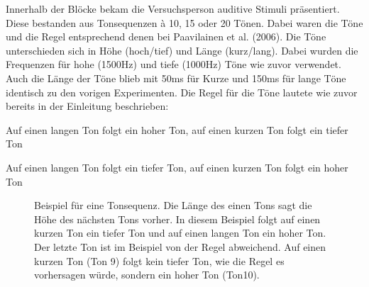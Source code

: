 \documentclass[doc,a4paper,12pt]{apa6}
\begin{document}
Innerhalb der Blöcke bekam die Versuchsperson auditive Stimuli präsentiert. Diese bestanden aus Tonsequenzen à 10, 15 oder 20 Tönen. Dabei waren die Töne und die Regel entsprechend denen bei Paavilainen et al. (2006). Die Töne unterschieden sich in Höhe (hoch/tief) und Länge (kurz/lang). Dabei wurden die Frequenzen für hohe (1500Hz) und tiefe (1000Hz) Töne wie zuvor verwendet. Auch die Länge der Töne blieb mit 50ms für Kurze und 150ms für lange Töne identisch zu den vorigen Experimenten. Die Regel für die Töne lautete wie zuvor bereits in der Einleitung beschrieben:

\begin{compactitem}
  \item Auf einen langen Ton folgt ein hoher Ton, auf einen kurzen Ton folgt ein tiefer
Ton
  \item Auf einen langen Ton folgt ein tiefer Ton, auf einen kurzen Ton folgt ein hoher
Ton
\end{compactitem}

\begin{figure}[t]
  \centering
  \begin{minipage}{\textwidth}
    \setlength{\fboxsep}{.05\textwidth}
    \vspace{10pt}
    \caption{Beispiel für eine Tonsequenz. Die Länge des einen Tons sagt die Höhe des nächsten Tons vorher. In diesem Beispiel folgt auf einen kurzen Ton ein tiefer Ton und auf einen langen Ton ein hoher Ton. Der letzte Ton ist im Beispiel von der Regel abweichend. Auf einen kurzen Ton (Ton 9) folgt kein tiefer Ton, wie die Regel es vorhersagen würde, sondern ein hoher Ton (Ton10).}
    \label{stimuli}
  \end{minipage}
\end{figure}
\end{document}
